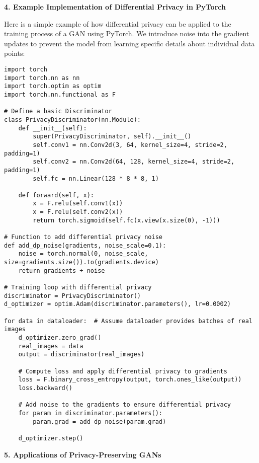 \textbf{4. Example Implementation of Differential Privacy in PyTorch}

Here is a simple example of how differential privacy can be applied to the training process of a GAN using PyTorch. We introduce noise into the gradient updates to prevent the model from learning specific details about individual data points:

\begin{lstlisting}[style=python]
import torch
import torch.nn as nn
import torch.optim as optim
import torch.nn.functional as F

# Define a basic Discriminator
class PrivacyDiscriminator(nn.Module):
    def __init__(self):
        super(PrivacyDiscriminator, self).__init__()
        self.conv1 = nn.Conv2d(3, 64, kernel_size=4, stride=2, padding=1)
        self.conv2 = nn.Conv2d(64, 128, kernel_size=4, stride=2, padding=1)
        self.fc = nn.Linear(128 * 8 * 8, 1)
    
    def forward(self, x):
        x = F.relu(self.conv1(x))
        x = F.relu(self.conv2(x))
        return torch.sigmoid(self.fc(x.view(x.size(0), -1)))

# Function to add differential privacy noise
def add_dp_noise(gradients, noise_scale=0.1):
    noise = torch.normal(0, noise_scale, size=gradients.size()).to(gradients.device)
    return gradients + noise

# Training loop with differential privacy
discriminator = PrivacyDiscriminator()
d_optimizer = optim.Adam(discriminator.parameters(), lr=0.0002)

for data in dataloader:  # Assume dataloader provides batches of real images
    d_optimizer.zero_grad()
    real_images = data
    output = discriminator(real_images)
    
    # Compute loss and apply differential privacy to gradients
    loss = F.binary_cross_entropy(output, torch.ones_like(output))
    loss.backward()
    
    # Add noise to the gradients to ensure differential privacy
    for param in discriminator.parameters():
        param.grad = add_dp_noise(param.grad)
    
    d_optimizer.step()
\end{lstlisting}

\textbf{5. Applications of Privacy-Preserving GANs}

